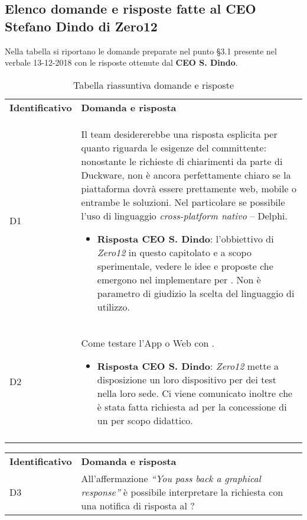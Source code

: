 	\subsection{Elenco domande e risposte fatte al CEO Stefano Dindo di Zero12}
	Nella tabella si riportano le domande preparate nel punto §3.1 presente nel verbale 13-12-2018 con le risposte ottenute dal \textbf{CEO S. Dindo}.
		\begin{center}
			\renewcommand{\arraystretch}{1.5}
			\begin{longtable}{  p{2.5cm} p{11.7cm} }
				\rowcolor{tableHeadYellow}
				\textbf{Identificativo}&\textbf{Domanda e risposta}\\
				D1 & Il team desidererebbe una risposta esplicita per quanto riguarda le esigenze del committente: nonostante le richieste di chiarimenti  da parte di Duckware, non è ancora perfettamente chiaro se la piattaforma dovrà  essere prettamente web, mobile o entrambe le soluzioni. Nel particolare se possibile l'uso di linguaggio \emph{cross-platform nativo} – Delphi.
				\begin{itemize}
					\item \textbf{Risposta CEO S. Dindo}: l'obbiettivo di \emph{Zero12} in questo capitolato e a scopo sperimentale, vedere le idee e proposte che emergono nel implementare \emph{\markg{workflow}} per \emph{\markg{Alexa}}. Non è parametro di giudizio la scelta del linguaggio di utilizzo.
				\end{itemize}
				\\
				D2 & Come testare l’App o Web con \markg{Alexa}.
				\begin{itemize}
					\item \textbf{Risposta CEO S. Dindo}: \emph{Zero12} mette a disposizione un loro dispositivo per dei test nella loro sede. Ci viene comunicato inoltre che è stata fatta richiesta ad \markg{Amazon} per la concessione di un \emph{\markg{Amazon} \markg{Alexa}} per scopo didattico.
				\end{itemize}
				\\
				\rowcolor{white}
				\caption{Tabella riassuntiva domande e risposte}
			\end{longtable}	
			\clearpage
			\renewcommand{\arraystretch}{1.5}
			\begin{longtable}{  p{2.5cm} p{11.7cm} }
				\rowcolor{tableHeadYellow}
					\textbf{Identificativo}&\textbf{Domanda e risposta}\\
				D3 &  All'affermazione \emph{“You pass back a graphical response”} è possibile interpretare la richiesta con una notifica di risposta al \markg{workflow}?

\end{longtable}
\end{center}
